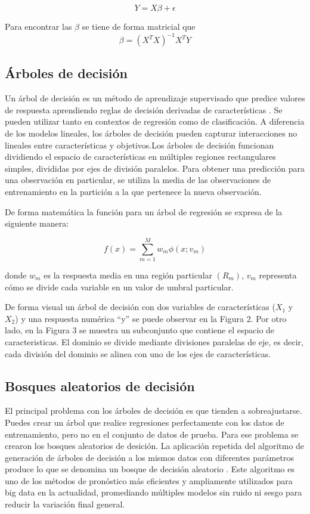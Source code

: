 \documentclass[conference]{IEEEtran}
\begin{document}
\begin{equation}
Y=X\beta+\epsilon
\end{equation}

Para encontrar las $\beta$ se tiene de forma matricial que
\begin{equation}
\beta=(X^TX)^{-1}X^TY
\end{equation}

\subsection{Árboles de decisión}
Un árbol de decisión es un método de aprendizaje supervisado que predice valores de respuesta aprendiendo reglas de decisión derivadas de características \cite{b3}. Se pueden utilizar tanto en contextos de regresión como de clasificación. A diferencia de los modelos lineales, los árboles de decisión pueden capturar interacciones no lineales entre características y objetivos.Los árboles de decisión funcionan dividiendo el espacio de características en múltiples regiones rectangulares simples, divididas por ejes de división paralelos. Para obtener una predicción para una observación en particular, se utiliza la media de las observaciones de entrenamiento en la partición a la que pertenece la nueva observación.

De forma matemática la función para un árbol de regresión se expresa de la siguiente manera: 

\begin{equation}
f(x)=\sum_{m=1}^{M} w_m\phi(x;v_m)
\end{equation}

donde $w_m$ es la respuesta media en una región particular $(R_m)$, $v_m$ representa cómo se divide cada variable en un valor de umbral particular.

De forma visual un árbol de decisión con dos variables de características ($X_1$ y $X_2$) y una respuesta numérica “y” se puede observar en la Figura 2. Por otro lado, en la Figura 3 se muestra un subconjunto que contiene el espacio de caracteristicas. El dominio se divide mediante divisiones paralelas de eje, es decir, cada división del dominio se alinea con uno de los ejes de características.

\subsection{Bosques aleatorios de decisión}
El principal problema con los árboles de decisión es que tienden a sobreajustarse. Puedes crear un árbol que realice regresiones perfectamente con los datos de entrenamiento, pero no en el conjunto de datos de prueba. Para ese problema se crearon los bosques aleatorios de desición. La aplicación repetida del algoritmo de generación de árboles de decisión a los mismos datos con diferentes parámetros produce lo que se denomina un bosque de decisión aleatorio \cite{b4}. Este algoritmo es uno de los métodos de pronóstico más eficientes y ampliamente utilizados para big data en la actualidad, promediando múltiples modelos sin ruido ni sesgo para reducir la variación final general. 
\end{document}
